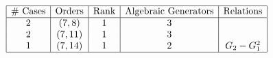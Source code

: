 \begin{table}[h]
	\centering
	$\begin{array}{|c|c|c|c|c|}
		\hline
		\text{\# Cases} & \text{Orders} & \text{Rank} & \text{Algebraic Generators} & \text{Relations} \\
		\hline
		2 & (7, 8) & 1 & 3 &  \\
		2 & (7, 11) & 1 & 3 &  \\
		1 & (7, 14) & 1 & 2 & G_2 - G_1^2 \\
		\hline
	\end{array}$
\end{table}
